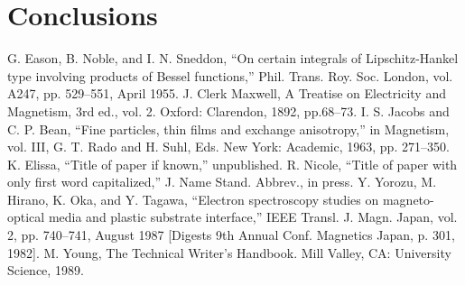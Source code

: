 \documentclass[conference]{IEEEtran}
\begin{document}
\section{Conclusions}

\begin{thebibliography}{00}
 G. Eason, B. Noble, and I. N. Sneddon, ``On certain integrals of Lipschitz-Hankel type involving products of Bessel functions,'' Phil. Trans. Roy. Soc. London, vol. A247, pp. 529--551, April 1955.
 J. Clerk Maxwell, A Treatise on Electricity and Magnetism, 3rd ed., vol. 2. Oxford: Clarendon, 1892, pp.68--73.
 I. S. Jacobs and C. P. Bean, ``Fine particles, thin films and exchange anisotropy,'' in Magnetism, vol. III, G. T. Rado and H. Suhl, Eds. New York: Academic, 1963, pp. 271--350.
 K. Elissa, ``Title of paper if known,'' unpublished.
 R. Nicole, ``Title of paper with only first word capitalized,'' J. Name Stand. Abbrev., in press.
 Y. Yorozu, M. Hirano, K. Oka, and Y. Tagawa, ``Electron spectroscopy studies on magneto-optical media and plastic substrate interface,'' IEEE Transl. J. Magn. Japan, vol. 2, pp. 740--741, August 1987 [Digests 9th Annual Conf. Magnetics Japan, p. 301, 1982].
 M. Young, The Technical Writer's Handbook. Mill Valley, CA: University Science, 1989.
\end{thebibliography}
\vspace{12pt}
\end{document}
